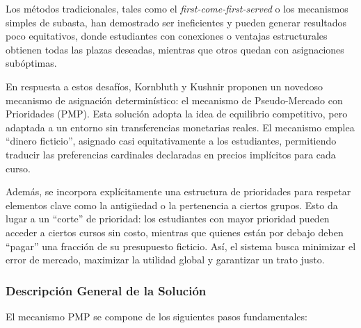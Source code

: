 \documentclass{article}
\begin{document}
Los métodos tradicionales, tales como el \textit{first-come-first-served} o los mecanismos simples de subasta, han demostrado ser ineficientes y pueden generar resultados poco equitativos, donde estudiantes con conexiones o ventajas estructurales obtienen todas las plazas deseadas, mientras que otros quedan con asignaciones subóptimas.

En respuesta a estos desafíos, Kornbluth y Kushnir proponen un novedoso mecanismo de asignación determinístico: el mecanismo de Pseudo-Mercado con Prioridades (PMP). Esta solución adopta la idea de equilibrio competitivo, pero adaptada a un entorno sin transferencias monetarias reales. El mecanismo emplea “dinero ficticio”, asignado casi equitativamente a los estudiantes, permitiendo traducir las preferencias cardinales declaradas en precios implícitos para cada curso.

Además, se incorpora explícitamente una estructura de prioridades para respetar elementos clave como la antigüedad o la pertenencia a ciertos grupos. Esto da lugar a un “corte” de prioridad: los estudiantes con mayor prioridad pueden acceder a ciertos cursos sin costo, mientras que quienes están por debajo deben “pagar” una fracción de su presupuesto ficticio. Así, el sistema busca minimizar el error de mercado, maximizar la utilidad global y garantizar un trato justo.

\subsubsection{Descripción General de la Solución}

El mecanismo PMP se compone de los siguientes pasos fundamentales:
\end{document}

